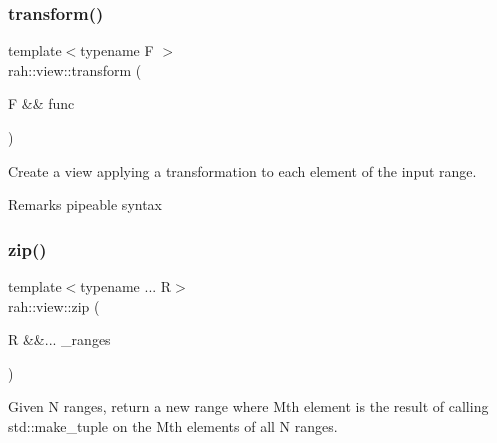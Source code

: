 \subsubsection{\texorpdfstring{transform()}{transform()}\hspace{0.1cm}{\footnotesize\ttfamily [2/2]}}
{\footnotesize\ttfamily template$<$typename F $>$ \\
rah\+::view\+::transform (\begin{DoxyParamCaption}\item[{F \&\&}]{func }\end{DoxyParamCaption})}



Create a view applying a transformation to each element of the input range. 

\begin{DoxyRemark}{Remarks}
pipeable syntax
\end{DoxyRemark}

\begin{DoxyCodeInclude}{0}
\end{DoxyCodeInclude}
\mbox{\label{namespacerah_1_1view_a5b9cacbf101962d95221b591d7f11026}} 
\subsubsection{\texorpdfstring{zip()}{zip()}}
{\footnotesize\ttfamily template$<$typename ... R$>$ \\
rah\+::view\+::zip (\begin{DoxyParamCaption}\item[{R \&\&...}]{\+\_\+ranges }\end{DoxyParamCaption})}



Given N ranges, return a new range where Mth element is the result of calling std\+::make\+\_\+tuple on the Mth elements of all N ranges. 


